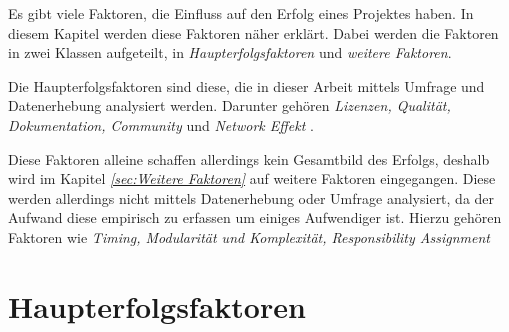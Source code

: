 


\bigskip

\noindent
Es gibt viele Faktoren, die Einfluss auf den Erfolg eines Projektes haben. In diesem Kapitel 
werden diese Faktoren näher erklärt. Dabei werden die Faktoren in zwei Klassen aufgeteilt, 
in \textit{Haupterfolgsfaktoren} und \textit{weitere Faktoren}.

Die Haupterfolgsfaktoren sind diese, die in dieser Arbeit mittels Umfrage und Datenerhebung analysiert
werden. Darunter gehören \textit{Lizenzen, Qualität, Dokumentation, Community} und
\textit{Network Effekt} .


Diese Faktoren alleine schaffen allerdings kein Gesamtbild des Erfolgs, deshalb wird im Kapitel 
\textit{\ref{sec:Weitere Faktoren}} auf weitere Faktoren eingegangen.
Diese werden allerdings nicht mittels Datenerhebung oder Umfrage analysiert, da der Aufwand
diese empirisch zu erfassen um einiges Aufwendiger ist. 
Hierzu gehören Faktoren wie \textit{Timing, Modularität und Komplexität, Responsibility
Assignment} 


\section{Haupterfolgsfaktoren} \label{sec:Haupterfolgsfaktoren}








